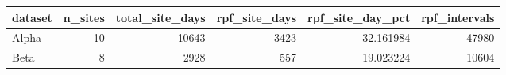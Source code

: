 \begin{tabular}{lrrrrr}
\toprule
dataset & n_sites & total_site_days & rpf_site_days & rpf_site_day_pct & rpf_intervals \\
\midrule
Alpha & 10 & 10643 & 3423 & 32.161984 & 47980 \\
Beta & 8 & 2928 & 557 & 19.023224 & 10604 \\
\bottomrule
\end{tabular}
